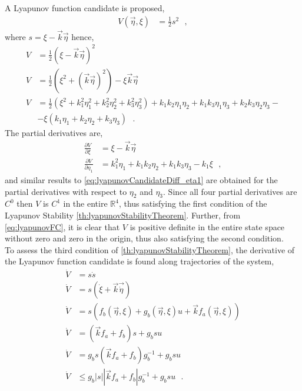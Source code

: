 A Lyapunov function candidate is proposed,
\begin{align}
  V(\vec{\eta}, \xi) &= \tfrac{1}{2}s^2 \ \ \ , \label{eq:lyapunovFunctionCandidate}
\end{align}
where $s = \xi - \vec{k} \vec{\eta}$ hence,
\begin{align}
V &= \tfrac{1}{2}(\xi - \vec{k} \vec{\eta})^2 \label{eq:lyapunovFC}\\
V &= \tfrac{1}{2}( \xi^2 + (\vec{k} \vec{\eta})^2 ) - \xi \vec{k} \vec{\eta} \\
V &= \tfrac{1}{2}( \xi^2 + k_1^2 \eta_1^2 + k_2^2 \eta_2^2 + k_3^2 \eta_3^2 ) + k_1 k_2 \eta_1 \eta_2 + k_1 k_3 \eta_1 \eta_3 + k_2 k_3 \eta_2 \eta_3 - \nonumber \\
  &- \xi ( k_1 \eta_1 + k_2 \eta_2 + k_3 \eta_3 )
\ \ \ . \label{eq:lyapunovFCExpanded}
\end{align}
The partial derivatives are,
\begin{align}
  \frac{\partial V}{\partial \xi}    &= \xi - \vec{k}\vec{\eta}
    \label{eq:lyapunovCandidateDiff_xi} \\
  \frac{\partial V}{\partial \eta_1} &= k_1^2 \eta_1 + k_1 k_2 \eta_2 + k_1 k_3 \eta_3 - k_1 \xi
    \label{eq:lyapunovCandidateDiff_eta1} 
    \ \ \ ,
\end{align}
and similar results to \autoref{eq:lyapunovCandidateDiff_eta1} are obtained for the partial derivatives with respect to $\eta_2$ and $\eta_3$. Since all four partial derivatives are $C^0$ then $V$ is $C^1$ in the entire $\mathbb{R} ^4$, thus satisfying the first condition of the Lyapunov Stability \autoref{th:lyapunovStabilityTheorem}. Further, from \autoref{eq:lyapunovFC}, it is clear that $V$ is positive definite in the entire state space without zero and zero in the origin, thus also satisfying the second condition.\\
To assess the third condition of \autoref{th:lyapunovStabilityTheorem}, the derivative of the Lyapunov function candidate is found along trajectories of the system,
\begin{align}
\dot{V} &= s\dot{s} \\
\dot{V} &= s ( \dot{\xi} + \vec{k}\vec{\dot{\eta}}  ) \\
\dot{V} &= s ( f_b(\vec{\eta},\xi) + g_b(\vec{\eta},\xi) u +\vec{k}f_a(\vec{\eta},\xi) )  \\
\dot{V} &= (\vec{k}f_a +  f_b) s + g_b s u \\
\dot{V} &= g_b s (\vec{k}f_a  +  f_b) g_b^{-1} + g_b s u   \\
\dot{V} &\leq g_b |s| \left|\vec{k}f_a  +  f_b \right| g_b^{-1} + g_b s u  \ \ \ .
\label{eq:lyapunov}
\end{align}
